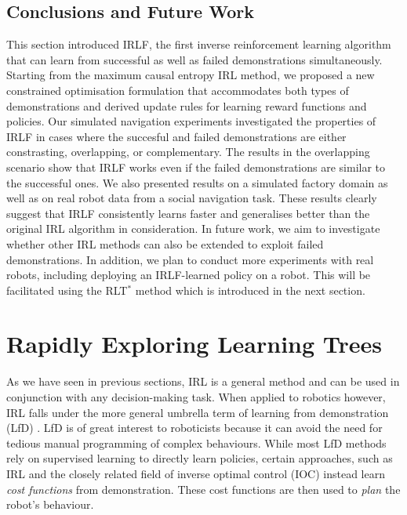 \documentclass[a4paper,11pt]{report}
\begin{document}
\subsection{Conclusions and Future Work}


This section introduced IRLF, the first inverse reinforcement learning algorithm that can learn from successful as well as failed demonstrations simultaneously. Starting from the maximum causal entropy IRL method, we proposed a new constrained optimisation formulation that accommodates both types of demonstrations and derived update rules for learning reward functions and policies. Our simulated navigation experiments investigated the properties of IRLF in cases where the succesful and failed demonstrations are either constrasting, overlapping, or complementary. The results in the overlapping scenario show that IRLF works even if the failed demonstrations are similar to the successful ones. We also presented results on a simulated factory domain as well as on real robot data from a social navigation task. These results clearly suggest that IRLF consistently learns faster and generalises better than the original IRL algorithm in consideration. In future work, we aim to investigate whether other IRL methods can also be extended to exploit failed demonstrations. In addition, we plan to conduct more experiments with real robots, including deploying an IRLF-learned policy on a robot. This will be facilitated using the RLT$^*$ method which is introduced in the next section.
\pagebreak


\section{Rapidly Exploring Learning Trees}
\label{sec:rrt-iros}
As we have seen in previous sections, IRL is a general method and can be used in conjunction with any decision-making task. When applied to robotics however, IRL falls under the more general umbrella term of learning from demonstration (LfD) \cite{argall2009survey}. LfD is of great interest to roboticists because it can avoid the need for tedious manual programming of complex behaviours. While most LfD methods rely on supervised learning to directly learn policies, certain approaches, such as IRL and the closely related field of inverse optimal control (IOC) \cite{kalman1964linear} instead learn \emph{cost functions} from demonstration. These cost functions are then used to \emph{plan} the robot's behaviour. 
\end{document}
